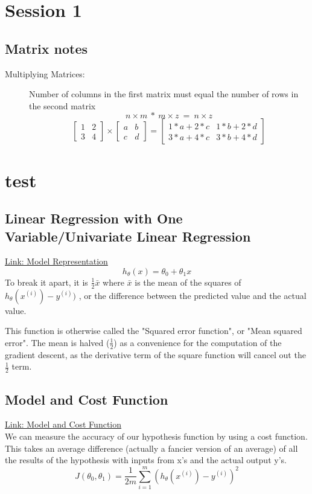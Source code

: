 \documentclass[a4paper]{report}
\begin{document}
\chapter{Session 1}
\section{Matrix notes}
\label{sec:matrix_notes}
\begin{description}
  \item[Multiplying Matrices:]
  Number of columns in the first matrix must equal the number of rows in the second matrix \\
$$ n\times m\ *\ m\times z\ =\ n\times z $$
  \[
\begin{bmatrix}
    1       & 2 \\
    3       & 4
\end{bmatrix}
\times
\begin{bmatrix}
    a       & b \\
    c       & d
\end{bmatrix}
  =
\begin{bmatrix}
    1*a+2*c       & 1*b+2*d \\
    3*a+4*c       & 3*b+4*d
\end{bmatrix}
\]
\end{description}
\chapter{test}
\section{Linear Regression with One Variable/Univariate Linear Regression}
\label{sec:linear_regression_one_variable}
\href{https://www.coursera.org/learn/machine-learning/lecture/db3jS/model-representation}{Link: Model Representation}
$$h_\theta(x)=\theta_0+\theta_1x$$
To break it apart, it is $\frac{1}{2} \bar{x}$ where $\bar{x}$ is the mean of the squares of $h_\theta(x^{(i)})-y^{(i)})$ , or the difference between the predicted value and the actual value.

This function is otherwise called the "Squared error function", or "Mean squared error". The mean is halved ($\frac{1}{2}$) as a convenience for the computation of the gradient descent, as the derivative term of the square function will cancel out the $\frac{1}{2}$ term.

\section{Model and Cost Function}
\label{sec:model_cost_function}
\href{https://www.coursera.org/learn/machine-learning/supplement/nhzyF/cost-function}{Link: Model and Cost Function} \\
We can measure the accuracy of our hypothesis function by using a cost function. This takes an average difference (actually a fancier version of an average) of all the results of the hypothesis with inputs from x's and the actual output y's.
$$J(\theta_0,\theta_1)=\dfrac{1}{2m}\sum_{i=1}^m(h_\theta(x^{(i)})-y^{(i)})^2$$
\end{document}
